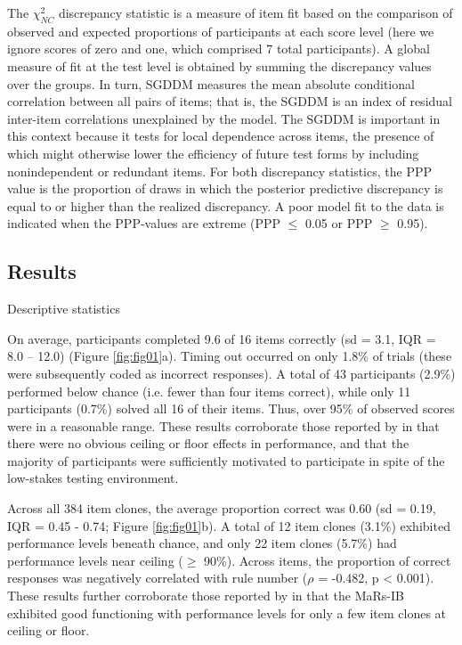 \documentclass[a4paper,man,natbib]{apa6}
\makeatletter
\renewcommand{\subsubsection}{\@startsection{subsubsection}{3}
  {\z@}%
  {\b@level@two@skip}{\e@level@two@skip}%
  {\normalfont\normalsize\bfseries}}
\makeatother
\begin{document}
The $\chi^2_{NC}$ discrepancy statistic is a measure of item fit based on the comparison of observed and expected proportions of participants at each score level (here we ignore scores of zero and one, which comprised 7 total participants). A global measure of fit at the test level is obtained by summing the discrepancy values over the groups. In turn, SGDDM measures the mean absolute conditional correlation between all pairs of items; that is, the SGDDM is an index of residual inter-item correlations unexplained by the model. The SGDDM is important in this context because it tests for local dependence across items, the presence of which might otherwise lower the efficiency of future test forms by including nonindependent or redundant items. For both discrepancy statistics, the PPP value is the proportion of draws in which the posterior predictive discrepancy is equal to or higher than the realized discrepancy. A poor model fit to the data is indicated when the PPP-values are extreme (PPP $\leq$ 0.05 or PPP $\geq$ 0.95).

\subsection{Results}

\subsubsection{Descriptive statistics}

On average, participants completed 9.6 of 16 items correctly (sd = 3.1, IQR = 8.0 -- 12.0) (Figure \ref{fig:fig01}a). Timing out occurred on only 1.8\% of trials (these were subsequently coded as incorrect responses). A total of 43 participants (2.9\%) performed below chance (i.e. fewer than four items correct), while only 11 participants (0.7\%) solved all 16 of their items. Thus, over 95\% of observed scores were in a reasonable range. These results corroborate those reported by \cite{chierchia2019matrix} in that there were no obvious ceiling or floor effects in performance, and that the majority of participants were sufficiently motivated to participate in spite of the low-stakes testing environment.  

Across all 384 item clones, the average proportion correct was 0.60 (sd = 0.19, IQR = 0.45 - 0.74; Figure \ref{fig:fig01}b). A total of 12 item clones (3.1\%) exhibited performance levels beneath chance, and only 22 item clones (5.7\%) had performance levels near ceiling ($\geq$ 90\%). Across items, the proportion of correct responses was negatively correlated with rule number ($\rho$ = -0.482, p < 0.001). These results further corroborate those reported by \cite{chierchia2019matrix} in that the MaRs-IB exhibited good functioning with performance levels for only a few item clones at ceiling or floor. 
\end{document}
